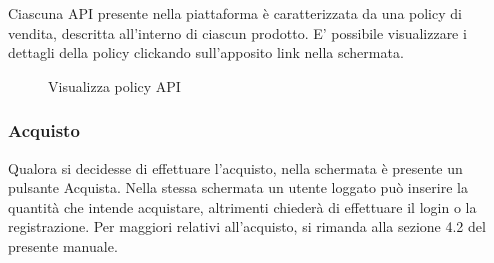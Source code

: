 Ciascuna API presente nella piattaforma è caratterizzata da una policy di vendita, descritta all'interno di ciascun prodotto. E' possibile visualizzare i dettagli della policy clickando sull'apposito link nella schermata.

\label{Visualizza policy API}
\begin{figure}[H]
	\centering
	\caption{Visualizza policy API}
\end{figure}

\subsubsection{Acquisto}
Qualora si decidesse di effettuare l'acquisto, nella schermata è presente un pulsante Acquista. Nella stessa schermata un utente loggato può inserire la quantità che intende acquistare, altrimenti chiederà di effettuare il login o la registrazione. Per maggiori relativi all'acquisto, si rimanda alla sezione 4.2 del presente manuale.




